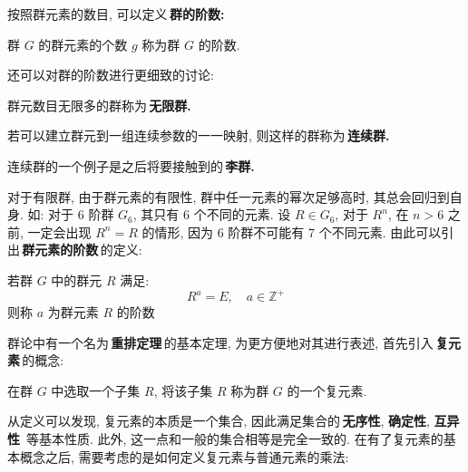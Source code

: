         \hspace*{2em}按照群元素的数目, 可以定义\,\textbf{群的阶数:}\,

            \begin{Definition}[群的阶数]
                群 $G$ 的群元素的个数 $g$ 称为群 $G$ 的阶数.
            \end{Definition}

        \hspace*{2em}还可以对群的阶数进行更细致的讨论:

            \begin{Concept}[无限群]
                群元数目无限多的群称为\,\textbf{无限群.}\,
            \end{Concept}

            \begin{Concept}[连续群]
                若可以建立群元到一组连续参数的一一映射, 则这样的群称为\,\textbf{连续群.}\,
            \end{Concept}
            连续群的一个例子是之后将要接触到的\,\textbf{李群.}\,

        \hspace*{2em}对于有限群, 由于群元素的有限性, 群中任一元素的幂次足够高时, 其总会回归到自身. 如: 对于 6 阶群 $G_{6}$, 其只有 6 个不同的元素. 设 $R \in G_{6}$, 对于 $R^n$, 在 $n > 6$ 之前, 一定会出现 $R^n = R$ 的情形, 因为 6 阶群不可能有 7 个不同元素. 由此可以引出\,\textbf{群元素的阶数}\,的定义:

            \begin{Definition}[群元素的阶数]
                若群 $G$ 中的群元 $R$ 满足:
                    \begin{equation}
                        R^{a} = E, \quad a \in \mathbb{Z}^{+}
                    \end{equation}
                则称 $a$ 为群元素 $R$ 的阶数
            \end{Definition}

        \hspace*{2em}群论中有一个名为\,\textbf{重排定理}\,的基本定理, 为更方便地对其进行表述, 首先引入\,\textbf{复元素}\,的概念:

            \begin{Concept}[复元素]
                在群 $G$ 中选取一个子集 $R$, 将该子集 $R$ 称为群 $G$ 的一个复元素.
            \end{Concept}

        从定义可以发现, 复元素的本质是一个集合, 因此满足集合的\,\textbf{无序性}, \textbf{确定性}, \textbf{互异性}\, 等基本性质. 此外,  这一点和一般的集合相等是完全一致的. 在有了复元素的基本概念之后, 需要考虑的是如何定义复元素与普通元素的乘法:

